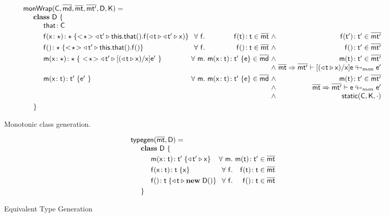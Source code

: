 \documentclass[a4paper,USenglish]{tex/lipics-v2016}
\begin{document}
\begin{figure}[!ht]
\hrulefill
\footnotesize
\[\begin{array}{l@{~}r@{}r@{~}r@{~}r@{~}rr}
\arrayrulecolor{white}
\classgen{\C, \b\md, \bmt, \bmtp, \D, \K}= \\
\SP \class~\D~\{ \\
\SPP \Fdef\that\C
\\[1mm]
\SPP \Mdef\f\x\any\any {\SubCast\any{\MonCast\tp{
      \Set{\Get\this\that}\f{\MonCast\t{\MonCast\tp\x}}}}}
&
\All f \Mtype\f\t\t\in\bmt &\wedge& \Mtype\f\tp\tp\in\bmtp
\\[1mm]\hline
\SPP \Mdefz\f\any{\SubCast\any{\MonCast\tp{\Get{\Get\this\that}\f}}}
&
 \All f \Mtype\f{}\t \in \bmt &\wedge& \Mtype\f{}\tp \in \bmtp
\\[1mm]\hline
\SPP \Mdef\m\x\any\any {~\SubCast\any{\MonCast\tp{{[{(\MonCast\t\x)}/\x]\ep}}}~}
&     \All \m \Mdef\m\x\t\tp\e\in\b\md &\wedge& \Mtype\m\t\tp\in\bmtp \\
&&&&\wedge&\rtranstz{\bmt}\bmtp{[{(\MonCast\t\x)}/\x]\e}{\ep}
\\[1mm]\hline
\SPP \Mdef\m\x\t\tp {\ep~}
&     \All \m \Mdef\m\x\t\tp{\e}\in\b\md &\wedge& \Mtype\m\t\tp\in\bmtp \\
&&&&\wedge&\rtranstz{\bmt}\bmtp{\e}{\ep} \\
&&&&\wedge&\statictype{\C}{\K}{\cdot}
\\[1mm]\hline
\SP\}
\end{array}
\]
\hrulefill
\caption{Monotonic class generation.}\label{classgen}
\end{figure}

\begin{figure}
\hrulefill
\footnotesize
\vspace{4mm}
\[\begin{array}{l@{~}r@{}r@{~}r@{~}r@{~}rr}
\arrayrulecolor{white}
\typegen{\bmt}{\D} = \\
\SP \class~\D~\{
\\[1mm]
\SPP \Mdef\m\x\t\tp {{\MonCast\tp{\x}}} 
&
\All m \Mtype\m\t\tp\in\bmt
\\[1mm]\hline
\SPP \Mdef\f\x\t\t {\x}
&
\All f \Mtype\f\t\t\in\bmt
\\[1mm]\hline
\SPP \Mdefz\f\t{{\MonCast\t{\New\D{}}}}
&
 \All f \Mtype\f{}\t \in \bmt
\\[1mm]
\SP\}
\end{array}
\]
\hrulefill
\caption{Equivalent Type Generation} \label{typegen}
\end{figure}
\end{document}
